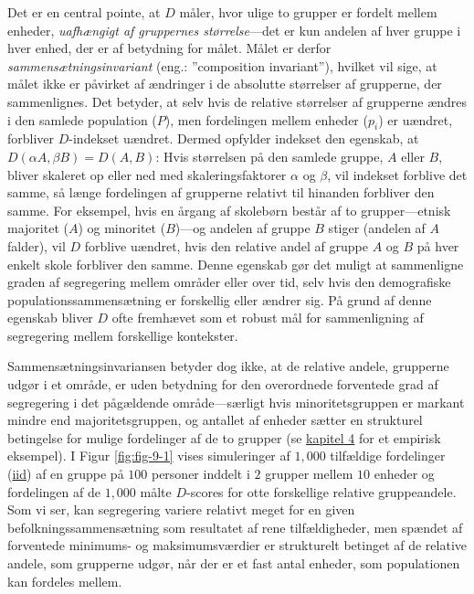 \documentclass[
]{book}
\begin{document}
Det er en central pointe, at \(D\) måler, hvor ulige to grupper er fordelt mellem enheder, \emph{uafhængigt af gruppernes størrelse}---det er kun andelen af hver gruppe i hver enhed, der er af betydning for målet. Målet er derfor \emph{sammensætningsinvariant} (eng.: ''composition invariant''), hvilket vil sige, at målet ikke er påvirket af ændringer i de absolutte størrelser af grupperne, der sammenlignes. Det betyder, at selv hvis de relative størrelser af grupperne ændres i den samlede population (\(P\)), men fordelingen mellem enheder (\(p_{i}\)) er uændret, forbliver \(D\)-indekset uændret. Dermed opfylder indekset den egenskab, at \(D \left( \alpha A, \beta B \right) = D \left( A, B \right)\): Hvis størrelsen på den samlede gruppe, \(A\) eller \(B\), bliver skaleret op eller ned med skaleringsfaktorer \(\alpha\) og \(\beta\), vil indekset forblive det samme, så længe fordelingen af grupperne relativt til hinanden forbliver den samme. For eksempel, hvis en årgang af skolebørn består af to grupper---etnisk majoritet (\(A\)) og minoritet (\(B\))---og andelen af gruppe \(B\) stiger (andelen af \(A\) falder), vil \(D\) forblive uændret, hvis den relative andel af gruppe \(A\) og \(B\) på hver enkelt skole forbliver den samme. Denne egenskab gør det muligt at sammenligne graden af segregering mellem områder eller over tid, selv hvis den demografiske populationssammensætning er forskellig eller ændrer sig. På grund af denne egenskab bliver \(D\) ofte fremhævet som et robust mål for sammenligning af segregering mellem forskellige kontekster.

Sammensætningsinvariansen betyder dog ikke, at de relative andele, grupperne udgør i et område, er uden betydning for den overordnede forventede grad af segregering i det pågældende område---særligt hvis minoritetsgruppen er markant mindre end majoritetsgruppen, og antallet af enheder sætter en strukturel betingelse for mulige fordelinger af de to grupper (se \hyperref[kap4]{kapitel 4} for et empirisk eksempel). I Figur \ref{fig:fig-9-1} vises simuleringer af \(1,000\) tilfældige fordelinger (\href{https://en.wikipedia.org/wiki/Independent_and_identically_distributed_random_variables}{iid}) af en gruppe på \(100\) personer inddelt i \(2\) grupper mellem \(10\) enheder og fordelingen af de \(1,000\) målte \(D\)-scores for otte forskellige relative gruppeandele. Som vi ser, kan segregering variere relativt meget for en given befolkningssammensætning som resultatet af rene tilfældigheder, men spændet af forventede minimums- og maksimumsværdier er strukturelt betinget af de relative andele, som grupperne udgør, når der er et fast antal enheder, som populationen kan fordeles mellem.
\end{document}
